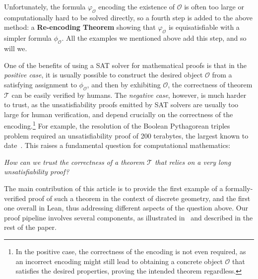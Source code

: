 Unfortunately, the formula $\varphi_{\mathcal{O}}$ encoding the existence of $\mathcal{O}$ is often too large or computationally hard to be solved directly, so a fourth step is added to the above method: a \textbf{Re-encoding Theorem} showing that $\varphi_{\mathcal{O}}$ is equisatisfiable with a simpler formula $\phi_{\mathcal{O}}$.
All the examples we mentioned above add this step, and so will we.

One of the benefits of using a SAT solver for mathematical proofs is that in the \emph{positive case}, it is usually possible to construct the desired object $\mathcal{O}$ from a satisfying assignment to $\phi_{\mathcal{O}}$, and then by exhibiting $\mathcal{O}$, the correctness of theorem $\mathcal{T}$ can be easily verified by humans.
The \emph{negative case}, however, is much harder to trust, as the unsatisfiability proofs emitted by SAT solvers are usually too large for human verification, and depend crucially on the correctness of the encoding.\footnote{In the positive case, the correctness of the encoding is not even required, as an incorrect encoding might still lead to obtaining a concrete object $\mathcal{O}$ that satisfies the desired properties, proving the intended theorem regardless.}
For example, the resolution of the Boolean Pythagorean triples problem required an unsatisfiability proof of 200 terabytes, the largest known to date~\cite{Heule_2016,lambTwohundredterabyteMathsProof2016}.
This raises a fundamental question for computational mathematics:
\begin{center}
  \emph{How can we trust the correctness of a theorem $\mathcal{T}$ that relies on a very long unsatisfiability proof?}
\end{center}

The main contribution of this article is to provide the first example of a formally-verified proof of such a theorem in the context of discrete geometry, and the first one overall in Lean, thus addressing different aspects of the question above.
Our proof pipeline involves several components, as illustrated in~ and described in the rest of the paper.

